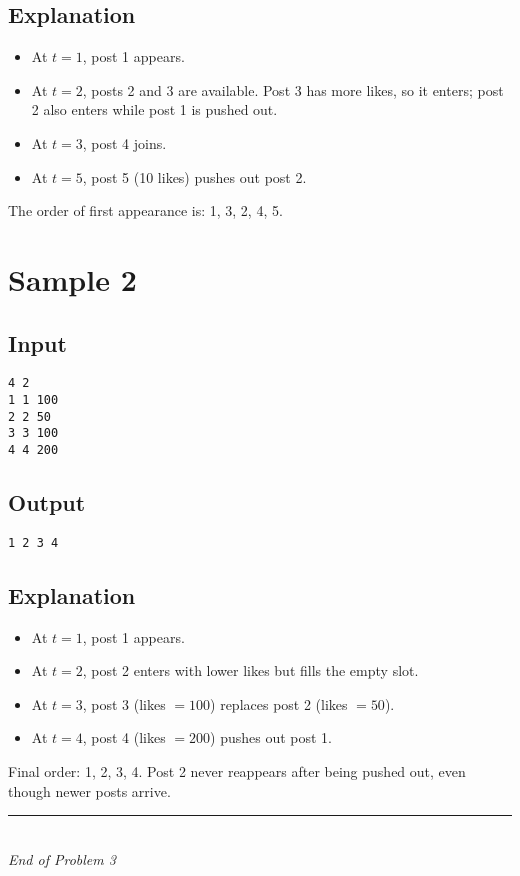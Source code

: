 \documentclass[12pt,a4paper]{article}
\begin{document}
\subsection*{Explanation}
\begin{itemize}
    \item At $t=1$, post 1 appears.  
    \item At $t=2$, posts 2 and 3 are available. Post 3 has more likes, so it enters; post 2 also enters while post 1 is pushed out.  
    \item At $t=3$, post 4 joins.  
    \item At $t=5$, post 5 (10 likes) pushes out post 2.  
\end{itemize}

The order of first appearance is: 1, 3, 2, 4, 5.  

\section*{Sample 2}
\subsection*{Input}
\begin{verbatim}
4 2
1 1 100
2 2 50
3 3 100
4 4 200
\end{verbatim}

\subsection*{Output}
\begin{verbatim}
1 2 3 4
\end{verbatim}

\subsection*{Explanation}
\begin{itemize}
    \item At $t=1$, post 1 appears.  
    \item At $t=2$, post 2 enters with lower likes but fills the empty slot.  
    \item At $t=3$, post 3 (likes $=100$) replaces post 2 (likes $=50$).  
    \item At $t=4$, post 4 (likes $=200$) pushes out post 1.  
\end{itemize}

Final order: 1, 2, 3, 4. Post 2 never reappears after being pushed out, even though newer posts arrive.  

\vfill
\begin{center}
    \rule{0.8\textwidth}{0.4pt} \\[0.5em]
    \textit{End of Problem 3}
\end{center}
\end{document}
